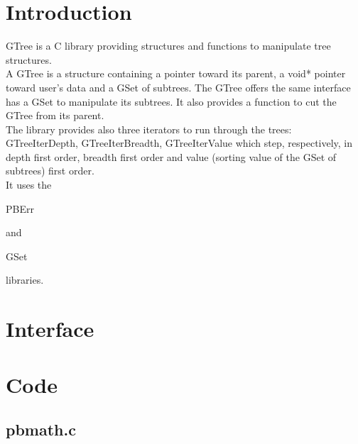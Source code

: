\section*{Introduction}

GTree is a C library providing structures and functions to manipulate tree structures.\\ 

A GTree is a structure containing a pointer toward its parent, a void* pointer toward user's data and a GSet of subtrees. The GTree offers the same interface has a GSet to manipulate its subtrees. It also provides a function to cut the GTree from its parent.\\

The library provides also three iterators to run through the trees: GTreeIterDepth, GTreeIterBreadth, GTreeIterValue which step, respectively, in depth first order, breadth first order and value (sorting value of the GSet of subtrees) first order.\\

It uses the \begin{ttfamily}PBErr\end{ttfamily} and \begin{ttfamily}GSet\end{ttfamily} libraries.\\

\section{Interface}

\begin{scriptsize}
\begin{ttfamily}

\end{ttfamily}
\end{scriptsize}

\section{Code}

\subsection{pbmath.c}

\begin{scriptsize}
\begin{ttfamily}

\end{ttfamily}
\end{scriptsize}

